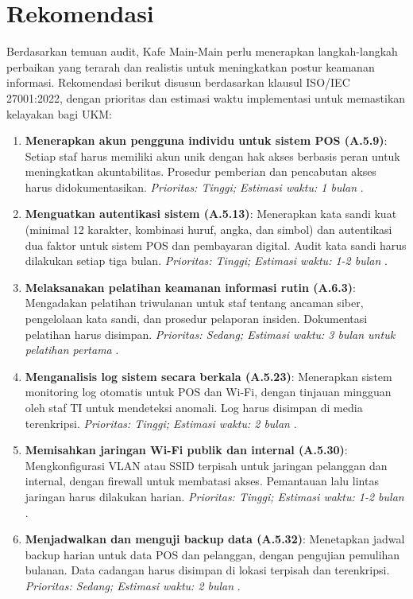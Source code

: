 \documentclass[12pt, a4paper]{report}
\begin{document}
\section{Rekomendasi}
Berdasarkan temuan audit, Kafe Main-Main perlu menerapkan langkah-langkah perbaikan yang terarah dan realistis untuk meningkatkan postur keamanan informasi. Rekomendasi berikut disusun berdasarkan klausul ISO/IEC 27001:2022, dengan prioritas dan estimasi waktu implementasi untuk memastikan kelayakan bagi UKM:
\begin{enumerate}
    \item \textbf{Menerapkan akun pengguna individu untuk sistem POS (A.5.9)}: Setiap staf harus memiliki akun unik dengan hak akses berbasis peran untuk meningkatkan akuntabilitas. Prosedur pemberian dan pencabutan akses harus didokumentasikan. \textit{Prioritas: Tinggi; Estimasi waktu: 1 bulan} \cite{widodo2022keamanan}.
    \item \textbf{Menguatkan autentikasi sistem (A.5.13)}: Menerapkan kata sandi kuat (minimal 12 karakter, kombinasi huruf, angka, dan simbol) dan autentikasi dua faktor untuk sistem POS dan pembayaran digital. Audit kata sandi harus dilakukan setiap tiga bulan. \textit{Prioritas: Tinggi; Estimasi waktu: 1-2 bulan} \citep{frangky2024implementasi}.
    \item \textbf{Melaksanakan pelatihan keamanan informasi rutin (A.6.3)}: Mengadakan pelatihan triwulanan untuk staf tentang ancaman siber, pengelolaan kata sandi, dan prosedur pelaporan insiden. Dokumentasi pelatihan harus disimpan. \textit{Prioritas: Sedang; Estimasi waktu: 3 bulan untuk pelatihan pertama} \citep{iso27001}.
    \item \textbf{Menganalisis log sistem secara berkala (A.5.23)}: Menerapkan sistem monitoring log otomatis untuk POS dan Wi-Fi, dengan tinjauan mingguan oleh staf TI untuk mendeteksi anomali. Log harus disimpan di media terenkripsi. \textit{Prioritas: Tinggi; Estimasi waktu: 2 bulan} \citep{sari2023backup}.
    \item \textbf{Memisahkan jaringan Wi-Fi publik dan internal (A.5.30)}: Mengkonfigurasi VLAN atau SSID terpisah untuk jaringan pelanggan dan internal, dengan firewall untuk membatasi akses. Pemantauan lalu lintas jaringan harus dilakukan harian. \textit{Prioritas: Tinggi; Estimasi waktu: 1-2 bulan} \citep{haryanto2021wifi}.
    \item \textbf{Menjadwalkan dan menguji backup data (A.5.32)}: Menetapkan jadwal backup harian untuk data POS dan pelanggan, dengan pengujian pemulihan bulanan. Data cadangan harus disimpan di lokasi terpisah dan terenkripsi. \textit{Prioritas: Sedang; Estimasi waktu: 2 bulan} \citep{sari2023backup}.

\end{enumerate}
\end{document}
